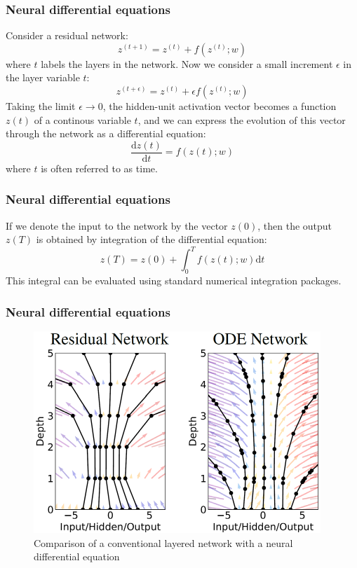 \documentclass{beamer}
\begin{document}
\begin{frame}
    \frametitle{Neural differential equations}
    Consider a residual network:
    \begin{equation*}
        z^{(t+1)}=z^{(t)}+f(z^{(t)};w)
    \end{equation*}
    where $t$ labels the layers in the network. Now we consider a small increment $\epsilon$ in the layer variable $t$:
    \begin{equation*}
        z^{(t+\epsilon)}=z^{(t)}+\epsilon{}f(z^{(t)};w)
    \end{equation*}
    Taking the limit $\epsilon\to{}0$, the hidden-unit activation vector becomes a function $z(t)$ of a continous variable $t$, and we can express the evolution of this vector through the network as a differential equation:
    \begin{equation*}
        \frac{\mathrm{d}z(t)}{\mathrm{d}t}=f(z(t);w)
    \end{equation*}
    where $t$ is often referred to as time.
\end{frame}

\begin{frame}
    \frametitle{Neural differential equations}
    If we denote the input to the network by the vector $z(0)$, then the output $z(T)$ is obtained by integration of the differential equation:
    \begin{equation*}
        z(T)=z(0)+\int_{0}^{T}f(z(t);w)\mathrm{d}t
    \end{equation*}
    This integral can be evaluated using standard numerical integration packages.
\end{frame}

\begin{frame}
    \frametitle{Neural differential equations}
    \begin{figure}
        \caption{Comparison of a conventional layered network with a neural differential equation}
        \includegraphics{Figure_5.pdf}
    \end{figure}
\end{frame}
\end{document}
